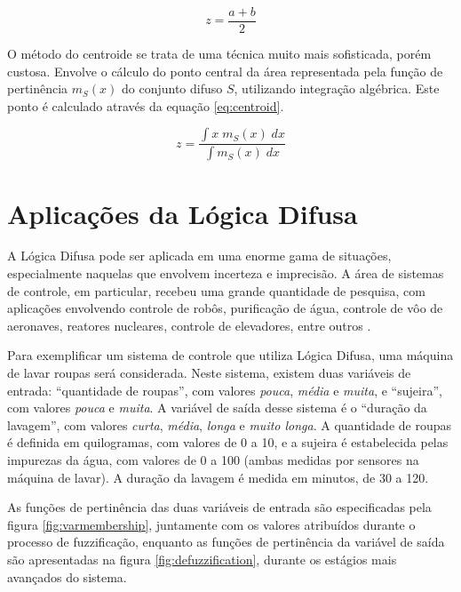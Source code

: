 \documentclass[12pt]{article}
\begin{document}
\begin{equation}
  \label{eq:mom}
  z = \frac{a + b}{2}
\end{equation}

O método do centroide se trata de uma técnica muito mais sofisticada, porém custosa. Envolve o cálculo do ponto central da área representada pela função de pertinência $m_{S}(x)$ do conjunto difuso $S$, utilizando integração algébrica. Este ponto é calculado através da equação \ref{eq:centroid}.

\begin{equation}
  \label{eq:centroid}
  z = \frac{\displaystyle\int x \; m_{S}(x) \; dx}{\displaystyle\int m_{S}(x)  \; dx}
\end{equation}

\section{Aplicações da Lógica Difusa} \label{sec:applications}

A Lógica Difusa pode ser aplicada em uma enorme gama de situações, especialmente naquelas que envolvem incerteza e imprecisão. A área de sistemas de controle, em particular, recebeu uma grande quantidade de pesquisa, com aplicações envolvendo controle de robôs, purificação de água, controle de vôo de aeronaves, reatores nucleares, controle de elevadores, entre outros \cite{Lee1990}.

Para exemplificar um sistema de controle que utiliza Lógica Difusa, uma máquina de lavar roupas será considerada. Neste sistema, existem duas variáveis de entrada: ``quantidade de roupas'', com valores \textit{pouca}, \textit{média} e \textit{muita}, e ``sujeira'', com valores \textit{pouca} e \textit{muita}. A variável de saída desse sistema é o ``duração da lavagem'', com valores \textit{curta}, \textit{média}, \textit{longa} e \textit{muito longa}. A quantidade de roupas é definida em quilogramas, com valores de 0 a 10, e a sujeira é estabelecida pelas impurezas da água, com valores de 0 a 100 (ambas medidas por sensores na máquina de lavar). A duração da lavagem é medida em minutos, de 30 a 120.

As funções de pertinência das duas variáveis de entrada são especificadas pela figura \ref{fig:varmembership}, juntamente com os valores atribuídos durante o processo de fuzzificação, enquanto as funções de pertinência da variável de saída são apresentadas na figura \ref{fig:defuzzification}, durante os estágios mais avançados do sistema.
\end{document}
